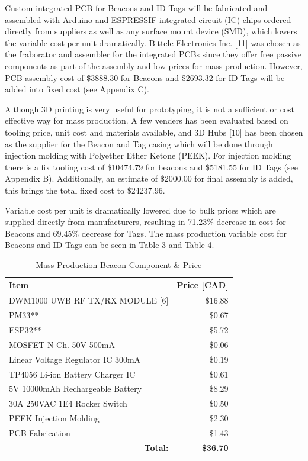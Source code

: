 \bigskip
Custom integrated PCB for Beacons and ID Tags will be fabricated and assembled with Arduino and ESPRESSIF integrated circuit (IC) chips ordered directly from suppliers as well as any surface mount device (SMD), which lowers the variable cost per unit dramatically. Bittele Electronics Inc. [11] was chosen as the fraborator and assembler for the integrated PCBs since they offer free passive components as part of the assembly and low prices for mass production. However, PCB assembly cost of \$3888.30 for Beacons and \$2693.32 for ID Tags will be added into fixed cost (see Appendix C). 

\bigskip
Although 3D printing is very useful for prototyping, it is not a sufficient or cost effective way for mass production. A few venders has been evaluated based on tooling price, unit cost and materials available, and 3D Hubs [10] has been chosen as the supplier for the Beacon and Tag casing which will be done through injection molding with Polyether Ether Ketone (PEEK). For injection molding there is a fix tooling cost of \$10474.79 for beacons and \$5181.55 for ID Tags (see Appendix B). Additionally, an estimate of \$2000.00 for final assembly is added, this brings the total fixed cost to \$24237.96.

\bigskip
Variable cost per unit is dramatically lowered due to bulk prices which are supplied directly from manufacturers, resulting in 71.23\% decrease in cost for Beacons and 69.45\% decrease for Tags. The mass production variable cost for Beacons and ID Tags can be seen in Table 3 and Table 4. 

\medskip
\def\arraystretch{1.5}
\begin{table}[H]
\centering
\begin{tabular}{ | m{12.5cm} | m{3cm} |}
\hline
\textbf{Item} & \textbf{Price [CAD]}\\
\hline
DWM1000 UWB RF TX/RX MODULE {[6]} & \multicolumn{1}{r|}{\$16.88} \\
\hline
PM33** & \multicolumn{1}{r|}{\$0.67} \\
\hline
ESP32** & \multicolumn{1}{r|}{\$5.72} \\
\hline
MOSFET N-Ch. 50V 500mA & \multicolumn{1}{r|}{\$0.06} \\
\hline
Linear Voltage Regulator IC 300mA & \multicolumn{1}{r|}{\$0.19} \\
\hline
TP4056 Li-ion Battery Charger IC & \multicolumn{1}{r|}{\$0.61} \\
\hline
5V 10000mAh Rechargeable Battery  & \multicolumn{1}{r|}{\$8.29} \\
\hline
30A 250VAC 1E4 Rocker Switch  & \multicolumn{1}{r|}{\$0.50} \\
\hline
PEEK Injection Molding & \multicolumn{1}{r|}{\$2.30} \\
\hline
PCB Fabrication & \multicolumn{1}{r|}{\$1.43} \\
\hline
\multicolumn{1}{|r|}{\textbf{Total:}} & \multicolumn{1}{r|}{\textbf{\$36.70}} \\
\hline
\end{tabular}
\caption{Mass Production Beacon Component \& Price}
\end{table}

